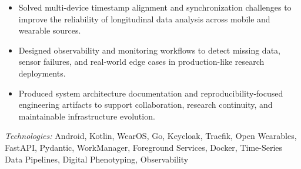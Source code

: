 \begin{itemize}
    \item Solved multi-device timestamp alignment and synchronization challenges to improve the reliability of longitudinal data analysis across mobile and wearable sources.

    \item Designed observability and monitoring workflows to detect missing data, sensor failures, and real-world edge cases in production-like research deployments.

    \item Produced system architecture documentation and reproducibility-focused engineering artifacts to support collaboration, research continuity, and maintainable infrastructure evolution.
\end{itemize}

\noindent
\textit{Technologies:} Android, Kotlin, WearOS, Go, Keycloak, Traefik, Open Wearables, FastAPI, Pydantic, WorkManager, Foreground Services, Docker, Time-Series Data Pipelines, Digital Phenotyping, Observability
